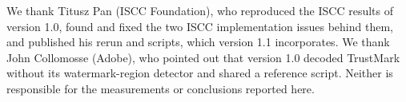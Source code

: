 We thank Titusz Pan (ISCC Foundation), who reproduced the ISCC results of version 1.0, found and fixed the two ISCC implementation issues behind them, and published his rerun and scripts, which version 1.1 incorporates. We thank John Collomosse (Adobe), who pointed out that version 1.0 decoded TrustMark without its watermark-region detector and shared a reference script. Neither is responsible for the measurements or conclusions reported here.
